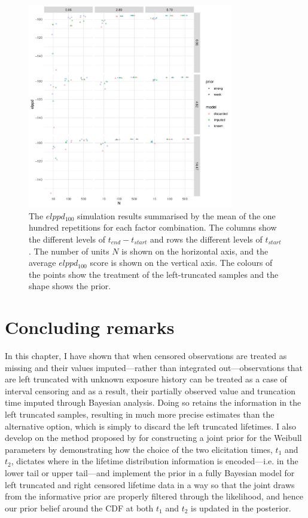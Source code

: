 \begin{figure}
    \centering
    \includegraphics[width=0.8\textwidth]{./figures/ch-2/sim-results-elppd.pdf}
    \caption{The $elppd_{100}$ simulation results summarised by the mean of the one hundred repetitions for each factor combination. The columns show the different levels of $t_{end} - t_{start}$ and rows the different levels of $t_{start}$. The number of units $N$ is shown on the horizontal axis, and the average $elppd_{100}$ score is shown on the vertical axis. The colours of the points show the treatment of the left-truncated samples and the shape shows the prior.}
    \label{fig:sim-study-elppd}
\end{figure}

\section{Concluding remarks} \label{sec:weibull-conclusion}

In this chapter, I have shown that when censored observations are treated as missing and their values imputed---rather than integrated out---observations that are left truncated with unknown exposure history can be treated as a case of interval censoring and as a result, their partially observed value and truncation time imputed through Bayesian analysis. Doing so retains the information in the left truncated samples, resulting in much more precise estimates than the alternative option, which is simply to discard the left truncated lifetimes. I also develop on the method proposed by \citet{kaminskiy2005} for constructing a joint prior for the Weibull parameters by demonstrating how the choice of the two elicitation times, $t_1$ and $t_2$, dictates where in the lifetime distribution information is encoded---i.e. in the lower tail or upper tail---and implement the prior in a fully Bayesian model for left truncated and right censored lifetime data in a way so that the joint draws from the informative prior are properly filtered through the likelihood, and hence our prior belief around the CDF at both $t_1$ and $t_2$ is updated in the posterior.

